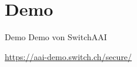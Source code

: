 
\section{Demo}

\begin{frame}{Demo}
    Demo von SwitchAAI

    \url{https://aai-demo.switch.ch/secure/}
\end{frame}
